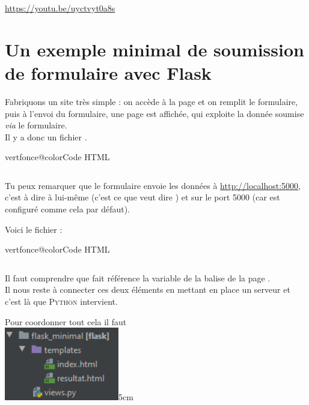 \documentclass[a4paper,11pt]{book}
\begin{document}
\url{https://youtu.be/uyctvyt0a8s}

\section*{Un exemple minimal de soumission de formulaire avec Flask}

Fabriquons un site très simple : on accède à la page  et on remplit le formulaire, puis à l'envoi du formulaire, une page 
 est affichée, qui exploite la donnée soumise \textit{via} le formulaire.\\

Il y a donc un fichier .
\begin{modulbox}{vertfonce@color}{Code HTML}
\inputminted{html}{flask_minimal/templates/index.html}
\end{modulbox}




Tu peux remarquer que le formulaire envoie les données à \url{http://localhost:5000}, c'est à dire à lui-même (c'est ce que veut dire ) 
et sur le port 5000 (car  est configuré comme cela par défaut).

Voici le fichier  :


\begin{modulbox}{vertfonce@color}{Code HTML}
\inputminted{html}{flask_minimal/templates/resultat.html}
\end{modulbox}

Il faut comprendre que   fait référence la variable  de la balise  de la page .\\

Il nous reste à connecter ces deux éléments en mettant en place un serveur  et c'est là que \textsc{Python} intervient.


Pour coordonner tout cela il faut \\
{\includegraphics[width=5cm]{img/arborescence_flask.png}}{5cm}
\end{document}
